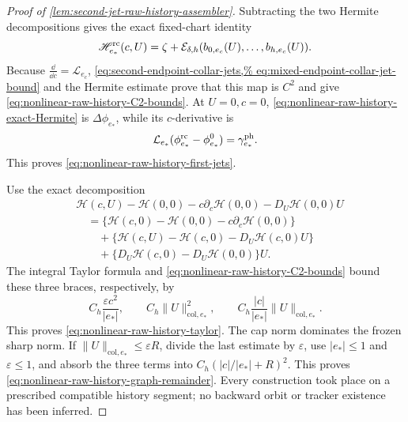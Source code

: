 \begin{proof}[Proof of
\cref{lem:second-jet-raw-history-assembler}]
Subtracting the two Hermite decompositions gives the exact fixed-chart
identity
\begin{equation}
 \mathscr H_{e_*}^{\rm rc}(c,U)
 =\zeta+\mathcal E_{\delta,h}
       (b_{0,e_c}(U),\ldots,b_{h,e_c}(U)).         \label{eq:nonlinear-raw-history-exact-Hermite}
\end{equation}
Because
\(\frac{\dd}{\dd c}=\mathcal L_{e_c}\),
\cref{eq:second-endpoint-collar-jets,%
eq:mixed-endpoint-collar-jet-bound} and the Hermite estimate prove that
this map is \(C^2\) and give
\cref{eq:nonlinear-raw-history-C2-bounds}.  At \(U=0,c=0\),
\cref{eq:nonlinear-raw-history-exact-Hermite} is
\(\Delta\phi_{e_*}\), while its \(c\)-derivative is
\[
 \mathcal L_{e_*}(\phi_{e_*}^{\rm rc}-\phi_{e_*}^0)
 =\gamma_{e_*}^{\rm ph}.
\]
This proves
\cref{eq:nonlinear-raw-history-first-jets}.

Use the exact decomposition
\begin{align*}
 &\mathscr H(c,U)-\mathscr H(0,0)
       -c\partial_c\mathscr H(0,0)-D_U\mathscr H(0,0)U\\
 &\quad=
 \{\mathscr H(c,0)-\mathscr H(0,0)
             -c\partial_c\mathscr H(0,0)\}\\
 &\qquad+
 \{\mathscr H(c,U)-\mathscr H(c,0)-D_U\mathscr H(c,0)U\}\\
 &\qquad+
 \{D_U\mathscr H(c,0)-D_U\mathscr H(0,0)\}U .
\end{align*}
The integral Taylor formula and
\cref{eq:nonlinear-raw-history-C2-bounds} bound these three braces,
respectively, by
\[
 C_h\frac{\varepsilon c^2}{|e_*|},\qquad
 C_h\|U\|_{\mathrm{col},e_*}^2,\qquad
 C_h\frac{|c|}{|e_*|}\|U\|_{\mathrm{col},e_*}.
\]
This proves
\cref{eq:nonlinear-raw-history-taylor}.  The cap norm dominates the frozen
sharp norm.  If
\(\|U\|_{\mathrm{col},e_*}\le\varepsilon R\), divide the last estimate by
\(\varepsilon\), use \(|e_*|\le1\) and \(\varepsilon\le1\), and absorb the
three terms into
\(C_h(|c|/|e_*|+R)^2\).  This proves
\cref{eq:nonlinear-raw-history-graph-remainder}.  Every construction took
place on a prescribed compatible history segment; no backward orbit or
tracker existence has been inferred.
\end{proof}

